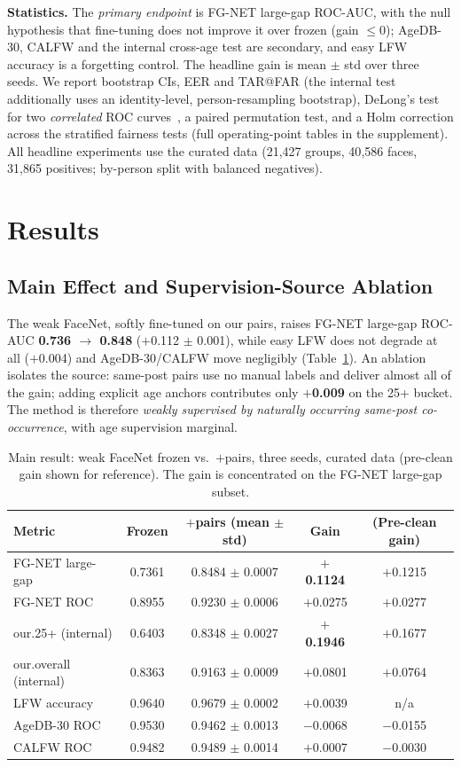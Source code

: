 \documentclass[letterpaper]{article} %
\begin{document}
\textbf{Statistics.} The \emph{primary endpoint} is FG-NET large-gap ROC-AUC, with the null hypothesis that fine-tuning does not improve it over frozen (gain $\leq 0$); AgeDB-30, CALFW and the internal cross-age test are secondary, and easy LFW accuracy is a forgetting control. The headline gain is mean $\pm$ std over three seeds. We report bootstrap CIs, EER and TAR@FAR (the internal test additionally uses an identity-level, person-resampling bootstrap), DeLong's test for two \emph{correlated} ROC curves~\cite{delong1988}, a paired permutation test, and a Holm correction across the stratified fairness tests (full operating-point tables in the supplement). All headline experiments use the curated data (21{,}427 groups, 40{,}586 faces, 31{,}865 positives; by-person split with balanced negatives).

\section{Results}\label{sec:results}
\subsection{Main Effect and Supervision-Source Ablation}\label{sec:res-main}
The weak FaceNet, softly fine-tuned on our pairs, raises FG-NET large-gap ROC-AUC \textbf{0.736 $\rightarrow$ 0.848} ($+$0.112 $\pm$ 0.001), while easy LFW does not degrade at all ($+$0.004) and AgeDB-30/CALFW move negligibly (Table~\ref{tab:main}). An ablation isolates the source: same-post pairs use no manual labels and deliver almost all of the gain; adding explicit age anchors contributes only \textbf{$+$0.009} on the 25+ bucket. The method is therefore \emph{weakly supervised by naturally occurring same-post co-occurrence}, with age supervision marginal.

\begin{table}[t]
\centering
\small
\begin{tabular}{@{}lcccc@{}}
\toprule
Metric & Frozen & $+$pairs (mean $\pm$ std) & Gain & (Pre-clean gain) \\
\midrule
FG-NET large-gap & 0.7361 & 0.8484 $\pm$ 0.0007 & \textbf{$+$0.1124} & $+$0.1215 \\
FG-NET ROC & 0.8955 & 0.9230 $\pm$ 0.0006 & $+$0.0275 & $+$0.0277 \\
our.25+ (internal) & 0.6403 & 0.8348 $\pm$ 0.0027 & \textbf{$+$0.1946} & $+$0.1677 \\
our.overall (internal) & 0.8363 & 0.9163 $\pm$ 0.0009 & $+$0.0801 & $+$0.0764 \\
LFW accuracy & 0.9640 & 0.9679 $\pm$ 0.0002 & $+$0.0039 & n/a \\
AgeDB-30 ROC & 0.9530 & 0.9462 $\pm$ 0.0013 & $-$0.0068 & $-$0.0155 \\
CALFW ROC & 0.9482 & 0.9489 $\pm$ 0.0014 & $+$0.0007 & $-$0.0030 \\
\bottomrule
\end{tabular}
\caption{Main result: weak FaceNet frozen vs.\ $+$pairs, three seeds, curated data (pre-clean gain shown for reference). The gain is concentrated on the FG-NET large-gap subset.}
\label{tab:main}
\end{table}
\end{document}
